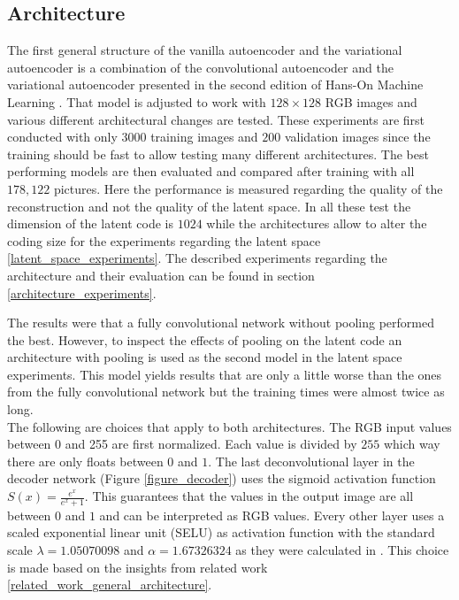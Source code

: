 \subsection{Architecture} \label{architecture}

The first general structure of the vanilla autoencoder and the variational autoencoder is a combination 
of the convolutional autoencoder and the variational autoencoder presented in the second edition of
Hans-On Machine Learning \parencite{2017-geron-homl}.
That model is adjusted to work with $128\times 128$ RGB images and various different architectural
changes are tested. These experiments are first conducted with only $3000$ training images and $200$ validation
images since the training should be fast to allow testing many different architectures. The best performing
models are then evaluated and compared after training with all $178,122$ pictures. 
Here the performance is measured regarding the quality of the reconstruction and not the quality of the latent space.
In all these test the dimension
of the latent code is $1024$ while the architectures allow to alter the coding size for the experiments regarding
the latent space \ref{latent_space_experiments}. The described experiments regarding the architecture and their
evaluation can be found
in section \ref{architecture_experiments}.

The results were that a fully convolutional network without pooling performed the best. However, to inspect the 
effects of pooling on the latent code an architecture with pooling is used as the second model in the latent space
experiments. This model yields results that are only a little worse than the ones from the fully convolutional
network but the training times were almost twice as long.\\

The following are choices that apply to both architectures. The RGB input values between 0 and 255 are first 
normalized. Each value is divided by $255$ which way there are only floats between $0$ and $1$.
The last deconvolutional layer in the decoder network (Figure \ref{figure_decoder}) uses the sigmoid activation
function $S(x) = \frac{e^x}{e^x+1}$. This guarantees that the values in the output image are all 
between $0$ and $1$ and can be interpreted as RGB values. 
Every other layer uses a scaled exponential linear unit (SELU) as activation function with the standard scale
$\lambda = 1.05070098$ and $\alpha = 1.67326324$ as they were calculated in \parencite{2017-klambauer-selu}.
This choice is made based on the insights from related work \ref{related_work_general_architecture}.

